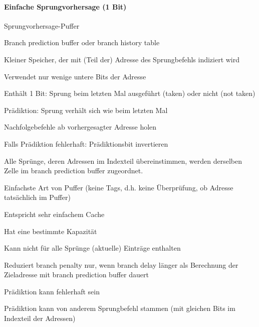 \documentclass[10pt,landscape]{article}
\begin{document}
\begin{multicols}{3}
  \paragraph{ Einfache Sprungvorhersage (1 Bit)}
  \begin{itemize*}
    \item Sprungvorhersage-Puffer
    \item Branch prediction buffer oder branch history table
    \item Kleiner Speicher, der mit (Teil der) Adresse des Sprungbefehls indiziert wird
    \item Verwendet nur wenige untere Bits der Adresse
    \item Enthält 1 Bit: Sprung beim letzten Mal ausgeführt (taken) oder nicht (not taken)
    \item Prädiktion: Sprung verhält sich wie beim letzten Mal
    \item Nachfolgebefehle ab vorhergesagter Adresse holen
    \item Falls Prädiktion fehlerhaft: Prädiktionsbit invertieren
    \item Alle Sprünge, deren Adressen im Indexteil übereinstimmen, werden derselben Zelle im branch prediction buffer zugeordnet.
    \item Einfachste Art von Puffer (keine Tags, d.h. keine Überprüfung, ob Adresse tatsächlich im Puffer)
    \item Entspricht sehr einfachem Cache
    \item Hat eine bestimmte Kapazität
    \item Kann nicht für alle Sprünge (aktuelle) Einträge enthalten
    \item Reduziert branch penalty nur, wenn branch delay länger als Berechnung der Zieladresse mit branch prediction buffer dauert
    \item Prädiktion kann fehlerhaft sein
    \item Prädiktion kann von anderem Sprungbefehl stammen (mit gleichen Bits im Indexteil der Adressen)
  \end{itemize*}
  

\end{multicols}
\end{document}
